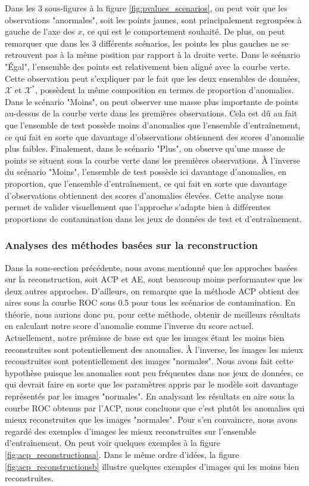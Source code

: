 Dans les 3 sous-figures à la figure \ref{fig:pvalues_scenarios}, on peut voir que les observations "anormales", soit les points jaunes, sont principalement regroupées à gauche de l'axe des $x$, ce qui est le comportement souhaité. De plus, on peut remarquer que dans les 3 différents scénarios, les points les plus gauches ne se retrouvent pas à la même position par rapport à la droite verte. Dans le scénario "Égal", l'ensemble des points est relativement bien aligné avec la courbe verte. Cette observation peut s'expliquer par le fait que les deux ensembles de données, $\mathcal{X}$ et $\mathcal{X^*}$, possèdent la même composition en termes de proportion d'anomalies. Dans le scénario "Moins", on peut observer une masse plus importante de points au-dessus de la courbe verte dans les premières observations. Cela est dû au fait que l'ensemble de test possède moins d'anomalies que l'ensemble d'entraînement, ce qui fait en sorte que davantage d'observations obtiennent des scores d'anomalie plus faibles. Finalement, dans le scénario "Plus", on observe qu'une masse de points se situent sous la courbe verte dans les premières observations. À l'inverse du scénario "Moins", l'ensemble de test possède ici davantage d'anomalies, en proportion, que l'ensemble d'entraînement, ce qui fait en sorte que davantage d'observations obtiennent des scores d'anomalies élevées. Cette analyse nous permet de valider visuellement que l'approche s'adapte bien à différentes proportions de contamination dans les jeux de données de test et d'entraînement.

\subsubsection{Analyses des méthodes basées sur la reconstruction} \label{imagenet:reconsruction}

Dans la sous-section précédente, nous avons mentionné que les approches basées sur la reconstruction, soit ACP et AE, sont beaucoup moins performantes que les deux autres approches. D'ailleurs, on remarque que la méthode ACP obtient des aires sous la courbe ROC sous 0.5 pour tous les scénarios de contamination. En théorie, nous aurions donc pu, pour cette méthode, obtenir de meilleurs résultats en calculant notre score d'anomalie comme l'inverse du score actuel. Actuellement, notre prémisse de base est que les images étant les moins bien reconstruites sont potentiellement des anomalies. À l'inverse, les images les mieux reconstruites sont potentiellement des images "normales". Nous avons fait cette hypothèse puisque les anomalies sont peu fréquentes dans nos jeux de données, ce qui devrait faire en sorte que les paramètres appris par le modèle soit davantage représentés par les images "normales". En analysant les résultats en aire sous la courbe ROC obtenus par l'ACP, nous concluons que c'est plutôt les anomalies qui mieux reconstruites que les images "normales". Pour s'en convaincre, nous avons regardé des exemples d'images les mieux reconstruites sur l'ensemble d'entraînement. On peut voir quelques exemples à la figure \ref{fig:acp_reconstructionsa}. Dans le même ordre d'idées, la figure \ref{fig:acp_reconstructionsb} illustre quelques exemples d'images qui les moins bien reconstruites. 

